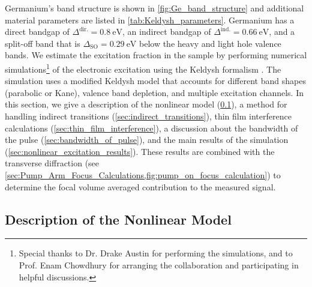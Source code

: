 Germanium's band structure is shown in \cref{fig:Ge_band_structure} and additional material parameters are listed in \cref{tab:Keldysh_parameters}. Germanium has a direct bandgap of $\Delta^{\textrm{dir.}} = 0.8 \ \textrm{eV}$, an indirect bandgap of $\Delta^{\textrm{ind.}} = 0.66 \ \textrm{eV}$, and a split-off band that is $\Delta_{\textrm{SO}} = 0.29 \ \textrm{eV}$ below the heavy and light hole valence bands. We estimate the excitation fraction in the sample by performing numerical simulations\footnote{Special thanks to Dr. Drake Austin for performing the simulations, and to Prof. Enam Chowdhury for arranging the collaboration and participating in helpful discussions.} of the electronic excitation using the Keldysh formalism \cite{sergaevaUltrafastExcitationConductionband2018,keldyshIonizationFieldStrong1965,vpopruzhenkoKeldyshTheoryStrong2014}. The simulation uses a modified Keldysh model that accounts for different band shapes (parabolic or Kane), valence band depletion, and multiple excitation channels.  In this section, we give a description of the nonlinear model (\cref{sec:nonlinear_excitation_model_details}), a method for handling indirect transitions (\cref{sec:indirect_transitions}), thin film interference calculations (\cref{sec:thin_film_interference}), a discussion about the bandwidth of the pulse (\cref{sec:bandwidth_of_pulse}), and the main results of the simulation (\cref{sec:nonlinear_excitation_results}). These results are combined with the transverse diffraction (see \cref{sec:Pump_Arm_Focus_Calculations,fig:pump_on_focus_calculation}) to determine the focal volume averaged contribution to the measured signal.

\subsection{Description of the Nonlinear Model}
\label{sec:nonlinear_excitation_model_details}

